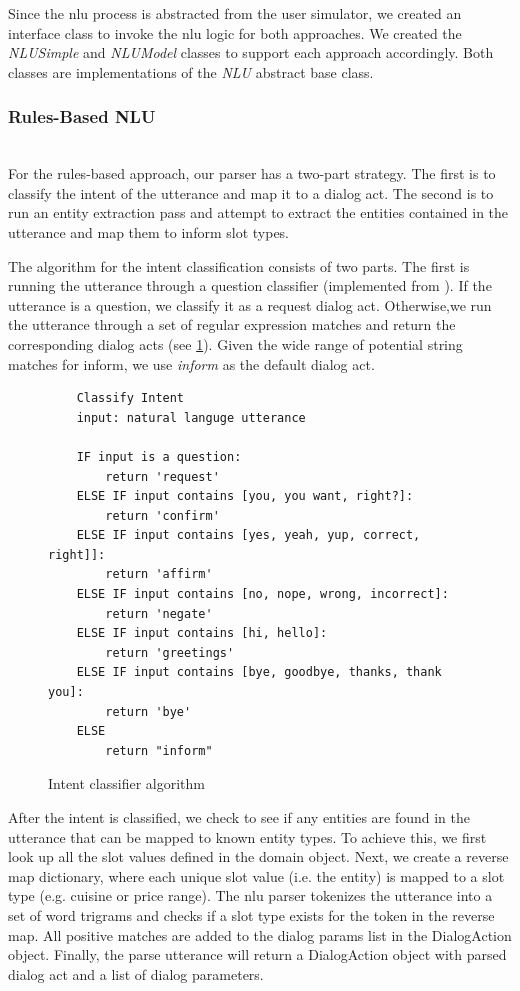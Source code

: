 Since the nlu process is abstracted from the user simulator, we created an interface class to invoke the nlu logic for both approaches. We created the \textit{NLUSimple} and \textit{NLUModel} classes to support each approach accordingly. Both classes are implementations of the\textit{ NLU} abstract base class. 

\subsubsection{Rules-Based NLU}
~ \\
For the rules-based approach, our parser has a two-part strategy. The first is to classify the intent of the utterance and map it to a dialog act. The second is to run an entity extraction pass and attempt to extract the entities contained in the utterance and map them to inform slot types.

The algorithm for the intent classification consists of two parts. The first is running the utterance through a question classifier (implemented from \cite{chewning_lord_yarvis_2015}). If the utterance is a question, we classify it as a request dialog act. Otherwise,we run the utterance through a set of regular expression matches and return the corresponding dialog acts (see \ref{fig:intent_clf}). Given the wide range of potential string matches for inform, we use \textit{inform} as the default dialog act. 

\begin{figure}[h!] 
	\label{fig:intent_clf}
	\begin{lstlisting}
	Classify Intent
	input: natural languge utterance
	
	IF input is a question:
		return 'request'
	ELSE IF input contains [you, you want, right?]:
		return 'confirm'
	ELSE IF input contains [yes, yeah, yup, correct, right]]:
		return 'affirm'
	ELSE IF input contains [no, nope, wrong, incorrect]:
		return 'negate'
	ELSE IF input contains [hi, hello]:
		return 'greetings'
	ELSE IF input contains [bye, goodbye, thanks, thank you]:
		return 'bye'
	ELSE
		return "inform"
	\end{lstlisting}
	\caption{ Intent classifier algorithm}
\end{figure}

After the intent is classified, we check to see if any entities are found in the utterance that can be mapped to known entity types. To achieve this, we first look up all the slot values defined in the domain object. Next, we create a reverse map dictionary, where each unique slot value (i.e. the entity) is mapped to a slot type (e.g. cuisine or price range). The nlu parser tokenizes the utterance into a set of word trigrams and checks if a slot type exists for the token in the reverse map. All positive matches are added to the dialog params list in the DialogAction object. Finally, the parse utterance will return a DialogAction object with parsed dialog act and a list of dialog parameters. 

